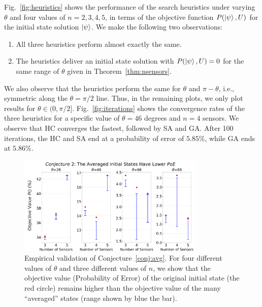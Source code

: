 





Fig.~\ref{fig:heuristics} shows the performance of the search heuristics
under varying $\theta$ and four values of $n = 2, 3, 4, 5$, in terms of the \iso objective function $P(\ket{\psi}, U)$ for the initial state solution $\ket{\psi}$. We make the following two observations:
\begin{enumerate}
    \item All three heuristics perform almost exactly the same.
    \item The heuristics deliver an initial state solution with $P(\ket{\psi}, U) = 0$ for the same range of $\theta$ given in Theorem~\ref{thm:nsensors}.
\end{enumerate}
We also observe that the heuristics perform the same for $\theta$ and $\pi - \theta$,
i.e., symmetric along the $\theta=\pi/2$ line. Thus, in the remaining plots, we only plot
results for $\theta \in (0, \pi/2]$.
Fig.~\ref{fig:iterations} shows the convergence rates of the three heuristics for a specific value of $\theta=46$ degrees and $n=4$ sensors. 
We observe that HC converges the fastest, followed by SA and GA.
After 100 iterations, the HC and SA end at a probability of error of $5.85\%$, while GA ends at $5.86\%$.



\begin{figure}[ht]
    \centering
    \includegraphics[width=0.8\textwidth]{chapters/tqc/figures/lemma2.png}
    \caption{Empirical validation of Conjecture~\ref{conj:avg}. For four different values of $\theta$ and three different values of $n$, we show that
    the objective value (Probability of Error) of the original initial state (the red circle) remains higher than the objective value of the many ``averaged'' states (range shown by blue the bar).}
    \label{fig:lemma2}
\end{figure}



